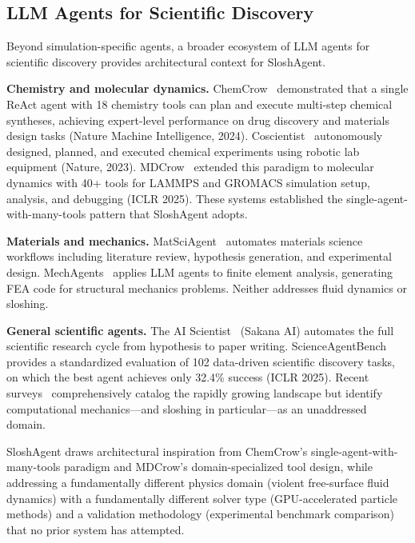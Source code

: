 \documentclass[11pt]{article}
\begin{document}
\subsection{LLM Agents for Scientific Discovery}

Beyond simulation-specific agents, a broader ecosystem of LLM agents for scientific discovery provides architectural context for SloshAgent.

\textbf{Chemistry and molecular dynamics.} ChemCrow~\citep{bran2024chemcrow} demonstrated that a single ReAct agent with 18 chemistry tools can plan and execute multi-step chemical syntheses, achieving expert-level performance on drug discovery and materials design tasks (Nature Machine Intelligence, 2024). Coscientist~\citep{boiko2023coscientist} autonomously designed, planned, and executed chemical experiments using robotic lab equipment (Nature, 2023). MDCrow~\citep{mdcrow2025} extended this paradigm to molecular dynamics with 40+ tools for LAMMPS and GROMACS simulation setup, analysis, and debugging (ICLR 2025). These systems established the single-agent-with-many-tools pattern that SloshAgent adopts.

\textbf{Materials and mechanics.} MatSciAgent~\citep{matsciagent2025} automates materials science workflows including literature review, hypothesis generation, and experimental design. MechAgents~\citep{mechagents2024} applies LLM agents to finite element analysis, generating FEA code for structural mechanics problems. Neither addresses fluid dynamics or sloshing.

\textbf{General scientific agents.} The AI Scientist~\citep{lu2024aiscientist} (Sakana AI) automates the full scientific research cycle from hypothesis to paper writing. ScienceAgentBench~\citep{scienceagentbench2025} provides a standardized evaluation of 102 data-driven scientific discovery tasks, on which the best agent achieves only 32.4\% success (ICLR 2025). Recent surveys~\citep{agentic2025, fromaitoscience2025} comprehensively catalog the rapidly growing landscape but identify computational mechanics---and sloshing in particular---as an unaddressed domain.

SloshAgent draws architectural inspiration from ChemCrow's single-agent-with-many-tools paradigm and MDCrow's domain-specialized tool design, while addressing a fundamentally different physics domain (violent free-surface fluid dynamics) with a fundamentally different solver type (GPU-accelerated particle methods) and a validation methodology (experimental benchmark comparison) that no prior system has attempted.
\end{document}
